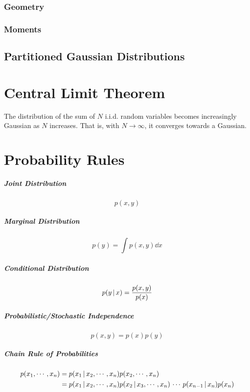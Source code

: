 			\subsubsection{Geometry} %

			\subsubsection{Moments} %

		\subsection{Partitioned Gaussian Distributions} %

	\section{Central Limit Theorem}
		The distribution of the sum of \(N\) i.i.d. random variables becomes increasingly Gaussian as \(N\) increases. That is, with \(N \to \infty\), it converges towards a Gaussian.

	\section{Probability Rules}
		\subparagraph{Joint Distribution}
		\begin{equation}
			p(x, y)
		\end{equation}

		\subparagraph{Marginal Distribution}
		\begin{equation}
			p(y) = \int p(x, y) \dd{x}
		\end{equation}

		\subparagraph{Conditional Distribution}
		\begin{equation}
			p(y \,\vert\, x) = \frac{p(x, y)}{p(x)}
		\end{equation}

		\subparagraph{Probabilistic/Stochastic Independence}
		\begin{equation}
			p(x, y) = p(x) p(y)
		\end{equation}

		\subparagraph{Chain Rule of Probabilities}
		\begin{align}
			p(x_1, \cdots, x_n) &= p(x_1 \,\vert\, x_2, \cdots, x_n) p(x_2, \cdots, x_n) \\
				&= p(x_1 \,\vert\, x_2, \cdots, x_n) p(x_2 \,\vert\, x_3, \cdots, x_n) \,\cdots\, p(x_{n - 1} \,\vert\, x_n) p(x_n)
		\end{align}

